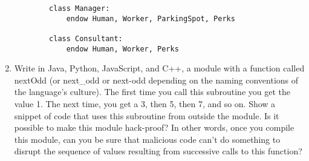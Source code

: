 \documentclass{article}
\begin{document}
\begin{enumerate}
\begin{verbatim}
        class Manager:
            endow Human, Worker, ParkingSpot, Perks

        class Consultant:
            endow Human, Worker, Perks
    \end{verbatim}
    \pagebreak
    \item Write in Java, Python, JavaScript, and C++, a module with a function called nextOdd (or next\_odd or next-odd depending on the naming conventions of the language's culture). The first time you call this subroutine you get the value 1. The next time, you get a 3, then 5, then 7, and so on. Show a snippet of code that uses this subroutine from outside the module. Is it possible to make this module hack-proof? In other words, once you compile this module, can you be sure that malicious code can't do something to disrupt the sequence of values resulting from successive calls to this function?
\end{enumerate}
\end{document}
